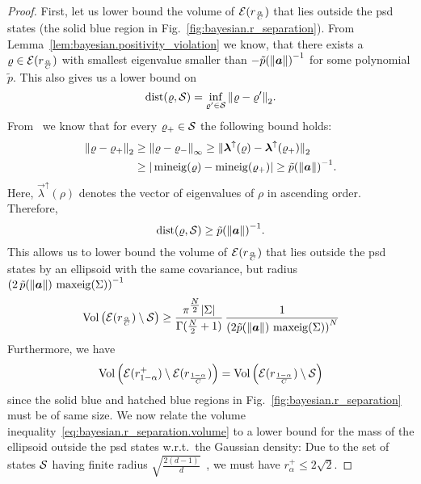 \begin{proof}
  First, let us lower bound the volume of $\mathcal{E}(r_\frac{\alpha}{C})$ that lies outside the psd states (the solid blue region in Fig.~\ref{fig:bayesian.r_separation}).
  From Lemma~\ref{lem:bayesian.positivity_violation} we know, that there exists a $\varrho\in \mathcal{E}(r_\frac{\alpha}{C})$ with smallest eigenvalue smaller than $- \tilde p{({\Vert{\boldsymbol{a}}\Vert})}^{-1}$ for some polynomial $\tilde p$.
  This also gives us a lower bound on
  \[
    \mathrm{dist}(\varrho,\mathcal{S}) = \inf_{\varrho' \in \mathcal{S}} {\Vert\varrho - \varrho'\Vert}_2.
  \]
  From~\cite[Theorem~III.2.8]{Bhatia_1997_Matrix} we know that for every $\varrho_+ \in \mathcal{S}$ the following bound holds:
  \[
    \begin{split}
      {\Vert\varrho - \varrho_+\Vert}_2
      &\ge {\Vert\varrho - \varrho_-\Vert}_\infty
      \ge {\Vert{\boldsymbol{\lambda}}^\uparrow(\varrho) - {\boldsymbol{\lambda}}^\uparrow(\varrho_+)\Vert}_2 \\
      &\ge {\vert\operatorname{mineig}(\varrho) - \operatorname{mineig}(\varrho_+)\vert}
      \ge \tilde p{({\Vert{\boldsymbol{a}}\Vert})}^{-1}.
    \end{split}
  \]
  Here, $\vec\lambda^\uparrow(\rho)$ denotes the vector of eigenvalues of $\rho$ in ascending order.
  Therefore,
  \[
    \label{eq:bayesian.r_separation.dist}
    \mathrm{dist}(\varrho,\mathcal{S}) \ge \tilde p{({\Vert{\boldsymbol{a}}\Vert})}^{-1}.
  \]
  This allows us to lower bound the volume of $\mathcal{E}(r_\frac{\alpha}{C})$ that lies outside the psd states by an ellipsoid with the same covariance, but radius ${(2\, \tilde p({\Vert{\boldsymbol{a}}\Vert}) \, \operatorname{maxeig}(\Sigma))}^{-1}$
  \begin{align}
    \label{eq:bayesian.r_separation.volume}
    \mathrm{Vol}\left( \mathcal{E}(r_\frac{\alpha}{C}) \setminus \mathcal{S} \right)
    &\ge \frac{\pi^{\tfrac{N}{2}} {\vert\Sigma\vert}}{\Gamma(\tfrac{N}{2} + 1)} \, \frac{1}{{\left( 2 \tilde p({\Vert{\boldsymbol{a}}\Vert}) \, \operatorname{maxeig}(\Sigma) \right)}^{N}} \\
  \end{align}
  Furthermore, we have
  \[
    \label{eq:bayesian.r_separation.volume2}
    \mathrm{Vol}\left(\mathcal{E}(r^+_{1-\alpha}) \setminus \mathcal{E}(r_\frac{1-\alpha}{C}) \right)
    = \mathrm{Vol}\left( \mathcal{E}(r_\frac{1-\alpha}{C}) \setminus \mathcal{S} \right)
  \]
  since the solid blue and hatched blue regions in Fig.~\ref{fig:bayesian.r_separation} must be of same size.
  We now relate the volume inequality~\eqref{eq:bayesian.r_separation.volume} to a lower bound for the mass of the ellipsoid outside the psd states w.r.t.\ the Gaussian density:
  Due to the set of states $\mathcal{S}$ having finite radius $\sqrt{\tfrac{2(d-1)}{d}}$~\cite[Eq.~(18)]{Kimura_2003_Bloch}, we must have $r^+_{\alpha} \le 2 \sqrt{2}$.

\end{proof}
